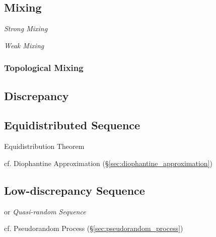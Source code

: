 \subsection{Mixing}\label{sec:mixing}

\emph{Strong Mixing}

\emph{Weak Mixing}



\subsubsection{Topological Mixing}\label{sec:topological_mixing}



\subsection{Discrepancy}\label{sec:discrepancy}

\subsection{Equidistributed Sequence}\label{sec:equidistributed_sequence}


Equidistribution Theorem

cf. Diophantine Approximation (\S\ref{sec:diophantine_approximation})



\subsection{Low-discrepancy Sequence}\label{sec:low_discrepancy}

or \emph{Quasi-random Sequence}

cf. Pseudorandom Process (\S\ref{sec:pseudorandom_process})

